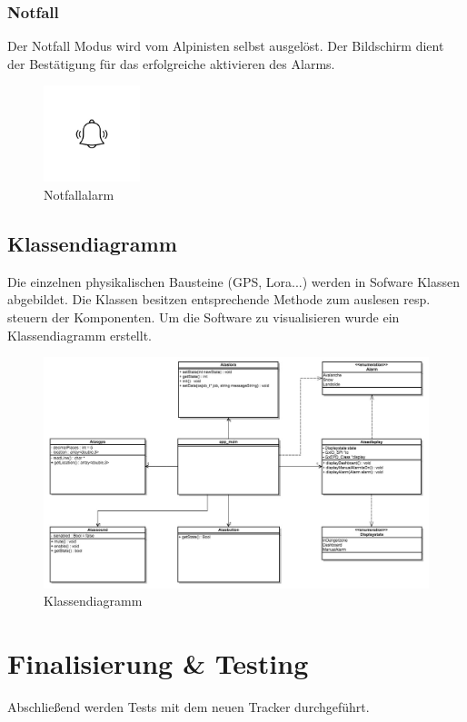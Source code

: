 \documentclass[11pt,english,german]{report}
\theoremstyle{definition}
\begin{document}
\subsubsection{Notfall}
Der Notfall Modus wird vom Alpinisten selbst ausgelöst. Der Bildschirm dient der Bestätigung für das erfolgreiche aktivieren des Alarms.
\begin{figure}[H]
	\centering
	\includegraphics[width=0.25\textwidth]{img/prototype/alarmbell.jpg}
	\caption[Notfallalarm]
	{Notfallalarm}
\end{figure}%

\newpage
\subsection{Klassendiagramm}
Die einzelnen physikalischen Bausteine (GPS, Lora...) werden in Sofware Klassen abgebildet. Die Klassen besitzen entsprechende Methode zum auslesen resp. steuern der Komponenten. Um die Software zu visualisieren wurde ein Klassendiagramm erstellt.
\begin{figure}[H]
	\centering
	\includegraphics[width=\textwidth]{img/classdiagram.jpg}
	\caption[Klassendiagramm]
	{Klassendiagramm}
\end{figure}

\newpage
\section{Finalisierung \& Testing}
Abschließend werden Tests mit dem neuen Tracker durchgeführt.
\end{document}

